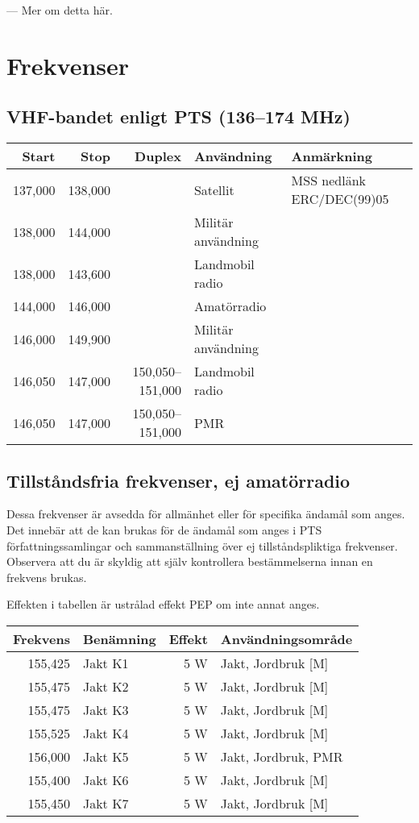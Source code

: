 \documentclass[10pt,swedish,a4paper]{article}
\begin{document}
--- Mer om detta här.

\section{Frekvenser}

\tiny
\subsection{VHF-bandet enligt PTS (136--174 MHz)}
\begin{tabular}{rrrll}
	  Start &    Stop &           Duplex & Användning         & Anmärkning                \\ \hline
	137,000 & 138,000 &                  & Satellit           & MSS nedlänk ERC/DEC(99)05 \\
	138,000 & 144,000 &                  & Militär användning &  \\
	138,000 & 143,600 &                  & Landmobil radio    &  \\
	144,000 & 146,000 &                  & Amatörradio        &  \\
	146,000 & 149,900 &                  & Militär användning &  \\
	146,050 & 147,000 & 150,050--151,000 & Landmobil radio    &  \\
	146,050 & 147,000 & 150,050--151,000 & PMR                &
\end{tabular}
\normalsize

\subsection{Tillståndsfria frekvenser, ej amatörradio}

Dessa frekvenser är avsedda för allmänhet eller för specifika ända\-mål som anges. Det innebär att de kan brukas för de ändamål som anges i PTS författningssamlingar och sammanställning över ej tillståndspliktiga frekvenser. Observera att du är skyldig att själv kontrollera bestämmelserna innan en frekvens brukas.

Effekten i tabellen är ustrålad effekt PEP om inte annat anges.

\begin{tabular}{rlrl}
	Frekvens & Benämning & Effekt & Användningsområde   \\ \hline
	 155,425 & Jakt K1   &    5 W & Jakt, Jordbruk [M]  \\
	 155,475 & Jakt K2   &    5 W & Jakt, Jordbruk [M]  \\
	 155,475 & Jakt K3   &    5 W & Jakt, Jordbruk [M]  \\
	 155,525 & Jakt K4   &    5 W & Jakt, Jordbruk [M]  \\
	 156,000 & Jakt K5   &    5 W & Jakt, Jordbruk, PMR \\
	 155,400 & Jakt K6   &    5 W & Jakt, Jordbruk [M]  \\
	 155,450 & Jakt K7   &    5 W & Jakt, Jordbruk [M]
\end{tabular}
\end{document}
